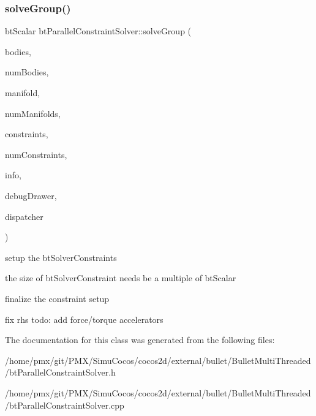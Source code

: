 \subsubsection{\texorpdfstring{solve\+Group()}{solveGroup()}}
{\footnotesize\ttfamily bt\+Scalar bt\+Parallel\+Constraint\+Solver\+::solve\+Group (\begin{DoxyParamCaption}\item[{bt\+Collision\+Object $\ast$$\ast$}]{bodies,  }\item[{int}]{num\+Bodies,  }\item[{bt\+Persistent\+Manifold $\ast$$\ast$}]{manifold,  }\item[{int}]{num\+Manifolds,  }\item[{bt\+Typed\+Constraint $\ast$$\ast$}]{constraints,  }\item[{int}]{num\+Constraints,  }\item[{const \hyperlink{structbtContactSolverInfo}{bt\+Contact\+Solver\+Info} \&}]{info,  }\item[{\hyperlink{classbtIDebugDraw}{bt\+I\+Debug\+Draw} $\ast$}]{debug\+Drawer,  }\item[{\hyperlink{classbtDispatcher}{bt\+Dispatcher} $\ast$}]{dispatcher }\end{DoxyParamCaption})\hspace{0.3cm}{\ttfamily [virtual]}}

setup the bt\+Solver\+Constraints

the size of bt\+Solver\+Constraint needs be a multiple of bt\+Scalar

finalize the constraint setup

fix rhs todo\+: add force/torque accelerators 

The documentation for this class was generated from the following files\+:\begin{DoxyCompactItemize}
\item 
/home/pmx/git/\+P\+M\+X/\+Simu\+Cocos/cocos2d/external/bullet/\+Bullet\+Multi\+Threaded/bt\+Parallel\+Constraint\+Solver.\+h\item 
/home/pmx/git/\+P\+M\+X/\+Simu\+Cocos/cocos2d/external/bullet/\+Bullet\+Multi\+Threaded/bt\+Parallel\+Constraint\+Solver.\+cpp\end{DoxyCompactItemize}
